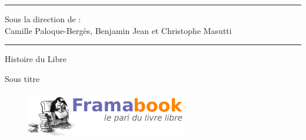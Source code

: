 \documentclass{FramateX}
\begin{document}
            
\begin{titlepage}
\noindent\rule{\linewidth}{1pt}
\begin{center}{Sous la direction de : \\ Camille Paloque-Bergès, Benjamin Jean et Christophe Masutti}\end{center}
\noindent\rule{\linewidth}{1pt}
\begin{center}\Huge{Histoire du Libre}\end{center}
\begin{center}\LARGE{Sous titre}\end{center}
\begin{center}

\begin{figure}[!ht]
\begin{center}  \includegraphics[width=70mm,height=20mm]{images/Logo_framabook_grand.png}  \end{center}
\end{figure}


\end{center}
\end{titlepage}
\end{document}
